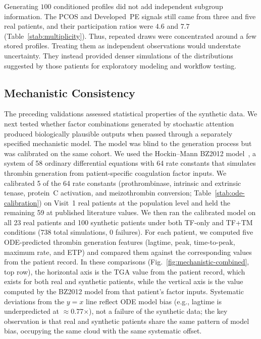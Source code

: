 Generating $100$ conditioned profiles did not add independent subgroup information.
The PCOS and Developed~PE signals still came from three and five real patients, and their
participation ratios were $4.6$ and $7.7$ (Table~\ref{stab:multiplicity}). Thus, repeated draws
were concentrated around a few stored profiles. Treating them as independent observations
would understate uncertainty. They instead provided denser simulations of the distributions
suggested by those patients for exploratory modeling and workflow testing.

\subsection{Mechanistic Consistency}
\label{sec:results-l4}

The preceding validations assessed statistical properties of the synthetic data. We
next tested whether factor combinations generated by stochastic attention produced
biologically plausible outputs when passed through a separately specified mechanistic model.
The model was blind to the generation process but was calibrated on the same cohort.
We used the Hockin--Mann BZ2012 model~\citep{Hockin2002,BrummelZiedins2012}, a system
of 58 ordinary differential equations with 64 rate constants that simulates thrombin
generation from patient-specific coagulation factor inputs. We calibrated 5 of the
64 rate constants (prothrombinase, intrinsic and extrinsic tenase, protein~C
activation, and meizothrombin conversion; Table~\ref{stab:ode-calibration}) on Visit~1 real
patients at the population level and held the remaining 59 at published literature
values. We then ran the calibrated model on all 23 real patients and 100 synthetic
patients under both TF-only and TF+TM conditions (738 total simulations, 0 failures). For each patient, we
computed five ODE-predicted thrombin generation features (lagtime, peak, time-to-peak,
maximum rate, and ETP) and compared them against the corresponding values from the
patient record. In these comparisons (Fig.~\ref{fig:mechanistic-combined}, top row),
the horizontal axis is the TGA value from the patient record, which exists for both
real and synthetic patients, while the vertical axis is the value computed by the
BZ2012 model from that patient's factor inputs. Systematic deviations from the
$y{=}x$ line reflect ODE model bias (e.g., lagtime is underpredicted at
$\approx$0.77$\times$), not a failure of the synthetic data; the key observation is
that real and synthetic patients share the same pattern of model bias, occupying the
same cloud with the same systematic offset.

